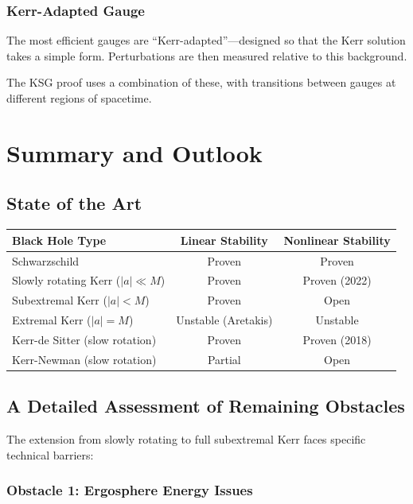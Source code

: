 \documentclass[12pt,a4paper]{article}
\begin{document}
\subsubsection{Kerr-Adapted Gauge}
The most efficient gauges are ``Kerr-adapted''---designed so that the Kerr solution takes a simple form. Perturbations are then measured relative to this background.

The KSG proof uses a combination of these, with transitions between gauges at different regions of spacetime.

\section{Summary and Outlook}

\subsection{State of the Art}

\begin{center}
\begin{tabular}{@{}lcc@{}}
\toprule
\textbf{Black Hole Type} & \textbf{Linear Stability} & \textbf{Nonlinear Stability} \\
\midrule
Schwarzschild & Proven & Proven \\
Slowly rotating Kerr ($|a| \ll M$) & Proven & Proven (2022) \\
Subextremal Kerr ($|a| < M$) & Proven & Open \\
Extremal Kerr ($|a| = M$) & Unstable (Aretakis) & Unstable \\
Kerr-de Sitter (slow rotation) & Proven & Proven (2018) \\
Kerr-Newman (slow rotation) & Partial & Open \\
\bottomrule
\end{tabular}
\end{center}

\subsection{A Detailed Assessment of Remaining Obstacles}

The extension from slowly rotating to full subextremal Kerr faces specific technical barriers:

\subsubsection{Obstacle 1: Ergosphere Energy Issues}
\end{document}
